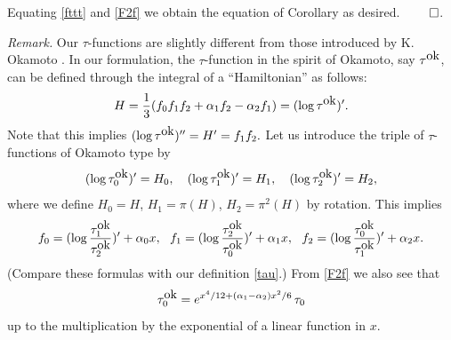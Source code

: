 Equating \eqref{fttt} and \eqref{F2f} we obtain the equation of 
Corollary as desired.
$\qed$. 
\par\medskip\noindent
{\em Remark.} \quad
Our $\tau$-functions are slightly different 
from those introduced by K. Okamoto \cite{Ok}.  
In our formulation, the $\tau$-function in the spirit of Okamoto, 
say $\tau^{\hbox{ok}}$, 
can be defined through the integral of a ``Hamiltonian'' as follows: 
\begin{equation}
H=\frac{1}{3}(f_0 f_1 f_2+\alpha_1 f_2-\alpha_2 f_1)=(\log\tau^{\hbox{ok}})'.
\end{equation}
Note that this implies
$(\log\tau^{\hbox{ok}})''=H'=f_1 f_2.$
Let us introduce the triple of $\tau$-functions of Okamoto type by 
\begin{equation}
(\log \tau_0^{\hbox{ok}})'=H_0, \quad 
(\log \tau_1^{\hbox{ok}})'=H_1, \quad 
(\log \tau_2^{\hbox{ok}})'=H_2, 
\end{equation}
where we define $H_0=H$, $H_1=\pi(H)$, $H_2=\pi^2(H)$ 
by rotation.  
This implies 
\begin{equation}
f_0=(\log {\tau_1^{\hbox{ok}} \over \tau_2^{\hbox{ok}}})'+\alpha_0 x, \ \ 
f_1=(\log {\tau_2^{\hbox{ok}} \over \tau_0^{\hbox{ok}}})'+\alpha_1 x, \ \ 
f_2=(\log {\tau_0^{\hbox{ok}} \over \tau_1^{\hbox{ok}}})'+\alpha_2 x. 
\end{equation}
(Compare these formulas with our definition \eqref{tau}.)
{}From \eqref{F2f} we also see that 
\begin{equation}
\tau_0^{\hbox{ok}}= e^{x^4/12+(\alpha_1-\alpha_2){x^2}/{6}} \, \tau_0
\end{equation}
up to the multiplication by the exponential of a linear function in $x$. 
\par\medskip
%
